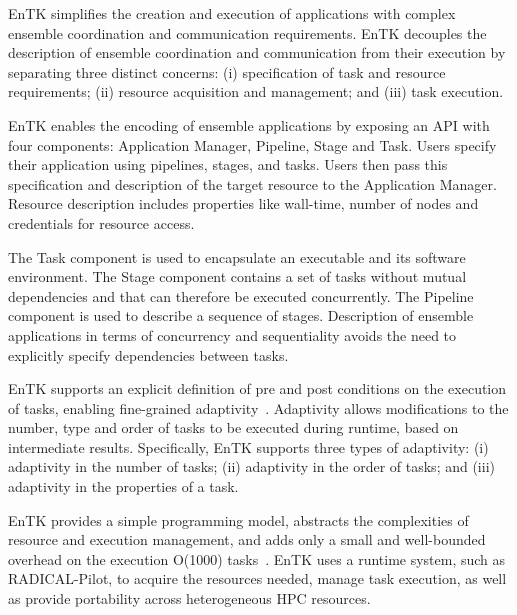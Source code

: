 EnTK simplifies the creation and execution of applications with complex
ensemble coordination and communication requirements. EnTK decouples the
description of ensemble coordination and communication from their execution by
separating three distinct concerns: (i) specification of task and resource
requirements; (ii) resource acquisition and management; and (iii) task
execution.



EnTK enables the encoding of ensemble applications by exposing an API with
four components: Application Manager, Pipeline, Stage and Task. Users specify
their application using pipelines, stages, and tasks. Users then pass this
specification and description of the target resource to the Application
Manager. Resource description includes properties like wall-time, number of
nodes and credentials for resource access.

The Task component is used to encapsulate an executable and its software
environment. The Stage component contains a set of tasks without mutual 
dependencies and that can therefore be executed concurrently. The Pipeline 
component is used to describe a sequence of stages. Description of ensemble
applications in terms of concurrency and sequentiality avoids the need to 
explicitly specify dependencies between tasks.

EnTK supports an explicit definition of pre and post conditions on the
execution of tasks, enabling fine-grained
adaptivity~\cite{balasubramanian2019adaptive}. Adaptivity allows modifications
to the number, type and order of tasks to be executed during runtime, based on
intermediate results. Specifically, EnTK supports three types of adaptivity:
(i) adaptivity in the number of tasks; (ii) adaptivity in the order of tasks;
and (iii) adaptivity in the properties of a task.


EnTK provides a simple programming model, abstracts the complexities of
resource and execution management, and adds only a small and well-bounded
overhead on the execution O(1000) tasks~\cite{balasubramanian2018harnessing}.
EnTK uses a runtime system, such as RADICAL-Pilot, to acquire the resources
needed, manage task execution, as well as provide portability across
heterogeneous HPC resources.



